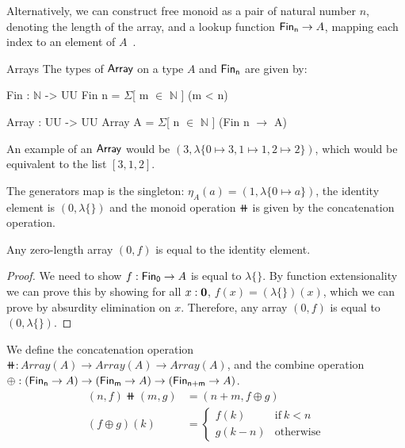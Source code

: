 Alternatively, we can construct free monoid as a pair of natural number $n$, denoting the length of the array,
and a lookup function $\Fin[n] \to A$, mapping each index to an element of $A$~\cite{dubucFreeMonoids1974}.

\begin{definition}{Arrays}\label{mon:array}
The types of $\operatorname{\mathsf{Array}}$ on a type $A$ and $\Fin[n]$ are given by:
\begin{code}
Fin : $\mathbb{N}$ -> UU
Fin n = $\Sigma$[ m $\in$ $\mathbb{N}$ ] (m < n)

Array : UU -> UU
Array A = $\Sigma$[ n $\in$ $\mathbb{N}$ ] (Fin n $\to$ A)
\end{code}
\vspace{1em}
\end{definition}

An example of an $\operatorname{\mathsf{Array}}$ would be $(3, \lambda\{ 0 \mapsto 3, 1 \mapsto 1, 2 \mapsto 2 \})$, which would
be equivalent to the list $[3, 1, 2]$.

The generators map is the singleton: $\eta_A(a) = (1, \lambda\{ 0 \mapsto a \})$, 
the identity element is $(0, \lambda\{\})$
and the monoid operation $\doubleplus$ is given by the concatenation operation.

\begin{lemma}\label{array:zero-is-id}
Any zero-length array $(0, f)$ is equal to the identity element.
\end{lemma}

\begin{proof}
We need to show $f : \Fin[0] \to A$ is equal to $\lambda\{\}$. By function extensionality we can prove
this by showing for all $x : {\mathbf{0}}$, $f(x) = (\lambda\{\})(x)$, which we can prove by absurdity elimination on $x$.
Therefore, any array $(0, f)$ is equal to $(0, \lambda\{\})$.
\end{proof}

\begin{definition}[Concatenation]
We define the concatenation operation $\doubleplus : Array(A) \to Array(A) \to Array(A)$,
and the combine operation $\oplus : (\Fin[n] \to A) \to (\Fin[m] \to A) \to (\Fin[n+m] \to\nolinebreak A)$.
\begin{align*}
    (n , f) \doubleplus (m , g) & = (n + m , f \oplus g) \\
    (f \oplus g)(k) & = \begin{cases}
      f(k) & \text{if}\ k < n \\
      g(k - n) & \text{otherwise}
    \end{cases}
\end{align*} 
\end{definition}

